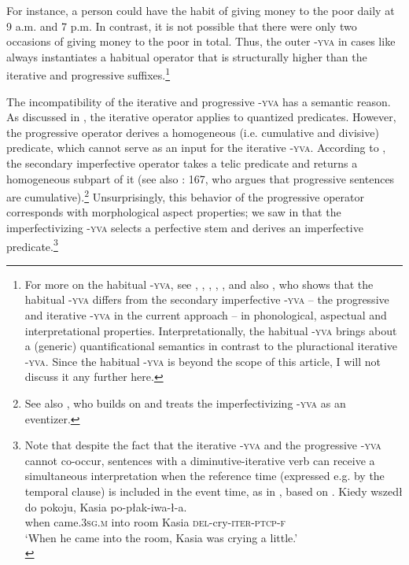 \documentclass[output=paper,colorlinks,citecolor=brown]{langscibook}
\begin{document}
\noindent For instance, a person could have the habit of giving money to the poor daily at 9 a.m. and 7 p.m. In contrast, it is not possible that there were only two occasions of giving money to the poor in total. Thus, the outer \textsc{-yva} in cases like  always instantiates a habitual operator that is structurally higher than the iterative and progressive suffixes.\footnote{For more on the habitual \textsc{-yva}, see \citet{Filip.Carlson1997}, \citet[321--340]{Esvan2007}, \citet{Berger2009}, \citet[132--135]{Nadenicek2011}, \citet{Nubler2017}, and also \citet{Biskup2021}%
, who shows that the habitual \textsc{-yva} differs from the secondary imperfective \textsc{-yva} -- the progressive and iterative \textsc{-yva} in the current approach -- in phonological, aspectual and interpretational properties. Interpretationally, the habitual \textsc{-yva} brings about a (generic) quantificational semantics in contrast to the pluractional iterative \textsc{-yva}. Since the habitual \textsc{-yva} is beyond the scope of this article, I will not discuss it any further here.}

The incompatibility of the iterative and progressive \textsc{-yva} has a semantic reason. As discussed in , the iterative operator applies to quantized predicates. However, the progressive operator derives a homogeneous (i.e. cumulative and divisive) predicate, which cannot serve as an input for the iterative \textsc{-yva}. According to \citet[137--138]{bis:Lazorczyk2010}, the secondary imperfective operator takes a telic predicate and returns a homogeneous subpart of it (see also \citealt{Filip1999}: 167, who argues that progressive sentences are cumulative).\footnote{See also \citet[489]{Tatevosov2015}, who builds on \citet[346]{PaslawskaStechow2003} and treats the imperfectivizing \textsc{-yva} as an eventizer.}  Unsurprisingly, this behavior of the progressive operator corresponds with morphological aspect properties; we saw in  that the imperfectivizing \textsc{-yva} selects a perfective stem and derives an imperfective predicate.\footnote{Note that despite the fact that the iterative \textsc{-yva} and the progressive \textsc{-yva} cannot co-occur, sentences with a diminutive-iterative verb can receive a simultaneous interpretation when the reference time (expressed e.g. by the temporal clause) is included in the event time, as in , based on . 
\ea\label{biskup:ex:kiedyfootnote}\gll Kiedy wszedł do pokoju, Kasia po-płak-iwa-ł-a.\\
when came.3\textsc{sg.m} into room Kasia \textsc{del}-cry-\textsc{iter-ptcp-f}\\
\glt ‘When he came into the room, Kasia was crying a little.’ \\
\z } 
\end{document}
